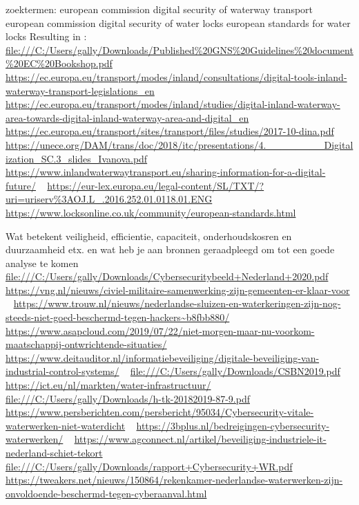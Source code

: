 \documentclass{article}
\begin{document}
zoektermen:
european commission digital security of waterway transport
european commission digital security of water locks
european standards for water locks
Resulting in :
~\cite{bookshopGuides}
\url{file:///C:/Users/gally/Downloads/Published%20GNS%20Guidelines%20document%20EC%20Bookshop.pdf}
~\cite{eudigittrans}
\url{https://ec.europa.eu/transport/modes/inland/consultations/digital-tools-inland-waterway-transport-legislations_en}
~\cite{euinlandwaterway}
\url{https://ec.europa.eu/transport/modes/inland/studies/digital-inland-waterway-area-towards-digital-inland-waterway-area-and-digital_en}
~\cite{ectransport}
\url{https://ec.europa.eu/transport/sites/transport/files/studies/2017-10-dina.pdf}
~\cite{uneceDAMsiled}
\url{https://unece.org/DAM/trans/doc/2018/itc/presentations/4.________Digitalization_SC.3_slides_Ivanova.pdf}
~\cite{inlandfuture}
\url{https://www.inlandwaterwaytransport.eu/sharing-information-for-a-digital-future/}
~\cite{eurlegal}
\url{https://eur-lex.europa.eu/legal-content/SL/TXT/?uri=uriserv%3AOJ.L_.2016.252.01.0118.01.ENG}
~\cite{europestandards}
\url{https://www.locksonline.co.uk/community/european-standards.html}


Wat betekent veiligheid, efficientie, capaciteit, onderhoudskosren en duurzaamheid etx. en wat heb je aan bronnen geraadpleegd om tot een goede analyse te komen
~\cite{cybersecuritybeeldned}
\url{file:///C:/Users/gally/Downloads/Cybersecuritybeeld+Nederland+2020.pdf}
~\cite{vngciviel}
\url{https://vng.nl/nieuws/civiel-militaire-samenwerking-zijn-gemeenten-er-klaar-voor}
~\cite{nedhack}
\url{https://www.trouw.nl/nieuws/nederlandse-sluizen-en-waterkeringen-zijn-nog-steeds-niet-goed-beschermd-tegen-hackers~b8fbb880/}
~\cite{asapcloud}
\url{https://www.asapcloud.com/2019/07/22/niet-morgen-maar-nu-voorkom-maatschappij-ontwrichtende-situaties/}
~\cite{beveiligingics}
\url{https://www.deitauditor.nl/informatiebeveiliging/digitale-beveiliging-van-industrial-control-systems/}
~\cite{CSBNDown}
\url{file:///C:/Users/gally/Downloads/CSBN2019.pdf}
~\cite{euictinfra}
\url{https://ict.eu/nl/markten/water-infrastructuur/}
~\cite{download9}
\url{file:///C:/Users/gally/Downloads/h-tk-20182019-87-9.pdf}
~\cite{persvitaal}
\url{https://www.persberichten.com/persbericht/95034/Cybersecurity-vitale-waterwerken-niet-waterdicht}
~\cite{cyberwater}
\url{https://3bplus.nl/bedreigingen-cybersecurity-waterwerken/}
~\cite{ittekort}
\url{https://www.agconnect.nl/artikel/beveiliging-industriele-it-nederland-schiet-tekort}
~\cite{wrcyber}
\url{file:///C:/Users/gally/Downloads/rapport+Cybersecurity+WR.pdf}
~\cite{rekenkamer}
\url{https://tweakers.net/nieuws/150864/rekenkamer-nederlandse-waterwerken-zijn-onvoldoende-beschermd-tegen-cyberaanval.html}
\end{document}
